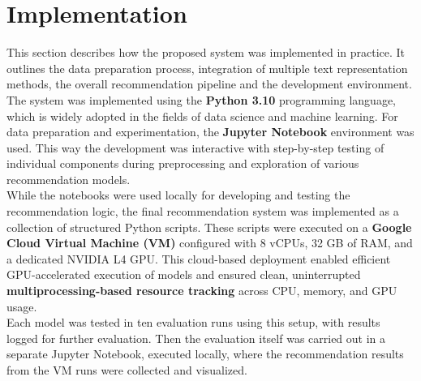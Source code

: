\documentclass[\myFontSize,a4paper,oneside,english,hidelinks]{article}
\begin{document}
%
%
%
%
%






\clearpage{}
\section{Implementation}
This section describes how the proposed system was implemented in practice. It outlines the data preparation process, integration of multiple text representation methods, the overall recommendation pipeline and the development environment.\\
The system was implemented using the \textbf{Python 3.10} programming language, which is widely adopted in the fields of data science and machine learning. For data preparation and experimentation, the \textbf{Jupyter Notebook} environment was used. This way the development was interactive with  step-by-step testing of individual components during preprocessing and exploration of various recommendation models.\\
While the notebooks were used locally for developing and testing the recommendation logic, the final recommendation system was implemented as a collection of structured Python scripts. These scripts were executed on a \textbf{Google Cloud Virtual Machine (VM)} configured with 8 vCPUs, 32 GB of RAM, and a dedicated NVIDIA L4 GPU. 
This cloud-based deployment enabled efficient GPU-accelerated execution of models and ensured clean, uninterrupted \textbf{multiprocessing-based resource tracking} across CPU, memory, and GPU usage. \\
Each model was tested in ten evaluation runs using this setup, with results logged for further evaluation. Then the evaluation itself was carried out in a separate Jupyter Notebook, executed locally, where the recommendation results from the VM runs were collected and visualized.
\end{document}
